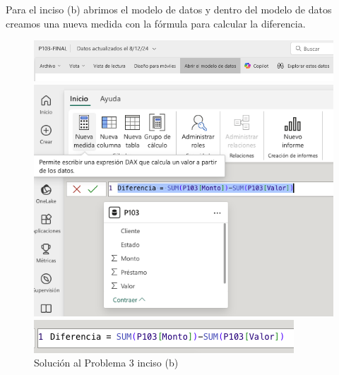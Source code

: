 \documentclass{article}
\begin{document}
\noindent
Para el inciso (b) abrimos el modelo de datos y dentro del modelo de datos creamos una nueva medida con la fórmula para calcular la diferencia.
\begin{figure}[!h]
    \centering
    \begin{minipage}{\textwidth}
        \centering
        \includegraphics[width=\textwidth]{figures/s103b-1.png}
    \end{minipage}
    \hfill
    \begin{minipage}{\textwidth}
        \centering
        \includegraphics[width=\textwidth]{figures/s103b-2.png}
    \end{minipage}
    \hfill
    \begin{minipage}{\textwidth}
        \centering
        \includegraphics[width=\textwidth]{figures/s103b-3.png}
    \end{minipage}
    \captionsetup{width=0.9\textwidth}
    \caption{Solución al Problema 3 inciso (b)}
    \label{fig:s103b}
\end{figure}
\end{document}
